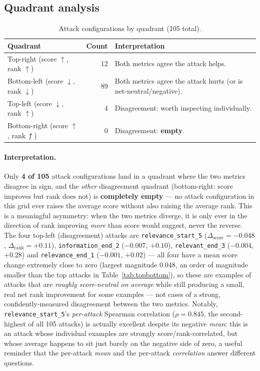 \documentclass[11pt]{article}
\newcommand{\score}{\operatorname{score}}
\newcommand{\rank}{\operatorname{rank}}
\begin{document}
\subsection{Quadrant analysis}
\label{sec:quadrants}

\begin{table}[H]
\centering
\caption{Attack configurations by quadrant (105 total).}
\label{tab:quadrants}
\begin{tabular}{lrl}
\toprule
Quadrant & Count & Interpretation \\
\midrule
Top-right (score $\uparrow$, rank $\uparrow$)   & 12 & Both metrics agree the attack helps. \\
Bottom-left (score $\downarrow$, rank $\downarrow$) & 89 & Both metrics agree the attack hurts (or is net-neutral/negative). \\
Top-left (score $\downarrow$, rank $\uparrow$)  & 4  & Disagreement: worth inspecting individually. \\
Bottom-right (score $\uparrow$, rank$\,\not\uparrow$) & 0 & Disagreement: \textbf{empty}. \\
\bottomrule
\end{tabular}
\end{table}

\paragraph{Interpretation.} Only \textbf{4 of 105} attack configurations
land in a quadrant where the two metrics disagree in sign, and the
\emph{other} disagreement quadrant (bottom-right: score improves but rank
does not) is \textbf{completely empty} --- no attack configuration in this
grid ever raises the average score without also raising the average rank.
This is a meaningful asymmetry: when the two metrics diverge, it is only
ever in the direction of rank improving \emph{more} than score would
suggest, never the reverse. The four top-left (disagreement) attacks are
\texttt{relevance\_start\_5} ($\Delta_{\score}=-0.048$,
$\Delta_{\rank}=+0.11$), \texttt{information\_end\_2} ($-0.007$, $+0.10$),
\texttt{relevant\_end\_3} ($-0.004$, $+0.28$) and \texttt{relevance\_end\_1}
($-0.001$, $+0.02$) --- all four have a mean score change extremely close
to zero (largest magnitude $0.048$, an order of magnitude smaller than the
top attacks in Table~\ref{tab:topbottom}), so these are examples of
attacks that are \emph{roughly score-neutral on average} while still
producing a small, real net rank improvement for some examples --- not
cases of a strong, confidently-measured disagreement between the two
metrics. Notably, \texttt{relevance\_start\_5}'s \emph{per-attack} Spearman
correlation ($\rho=0.845$, the second-highest of all 105 attacks) is
actually excellent despite its negative \emph{mean}: this is an attack
whose individual examples are strongly score/rank-correlated, but whose
average happens to sit just barely on the negative side of zero, a useful
reminder that the per-attack \emph{mean} and the per-attack
\emph{correlation} answer different questions.
\end{document}
